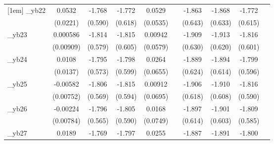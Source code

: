 \begin{table}[htbp]
\begin{tabular}{l*{9}{c}}
[1em]
\_yb22       &      0.0532\sym{**} &      -1.768\sym{***}&      -1.772\sym{***}&      0.0529         &                     &      -1.863\sym{***}&      -1.868\sym{***}&      -1.772\sym{***}&                     \\
            &    (0.0221)         &     (0.590)         &     (0.618)         &    (0.0535)         &                     &     (0.643)         &     (0.633)         &     (0.615)         &                     \\
[1em]
\_yb23       &    0.000586         &      -1.814\sym{***}&      -1.815\sym{***}&     0.00942         &                     &      -1.909\sym{***}&      -1.913\sym{***}&      -1.816\sym{***}&                     \\
            &   (0.00909)         &     (0.579)         &     (0.605)         &    (0.0579)         &                     &     (0.630)         &     (0.620)         &     (0.601)         &                     \\
[1em]
\_yb24       &      0.0108         &      -1.795\sym{***}&      -1.798\sym{***}&      0.0264         &                     &      -1.889\sym{***}&      -1.894\sym{***}&      -1.799\sym{***}&                     \\
            &    (0.0137)         &     (0.573)         &     (0.599)         &    (0.0655)         &                     &     (0.624)         &     (0.614)         &     (0.596)         &                     \\
[1em]
\_yb25       &    -0.00582         &      -1.806\sym{***}&      -1.815\sym{***}&     0.00912         &                     &      -1.906\sym{***}&      -1.910\sym{***}&      -1.816\sym{***}&                     \\
            &   (0.00752)         &     (0.569)         &     (0.594)         &    (0.0695)         &                     &     (0.618)         &     (0.608)         &     (0.590)         &                     \\
[1em]
\_yb26       &    -0.00224         &      -1.796\sym{***}&      -1.805\sym{***}&      0.0168         &                     &      -1.897\sym{***}&      -1.901\sym{***}&      -1.809\sym{***}&                     \\
            &   (0.00784)         &     (0.565)         &     (0.590)         &    (0.0749)         &                     &     (0.614)         &     (0.603)         &     (0.585)         &                     \\
[1em]
\_yb27       &      0.0189         &      -1.769\sym{***}&      -1.797\sym{***}&      0.0255         &                     &      -1.887\sym{***}&      -1.891\sym{***}&      -1.800\sym{***}&                     \\

\end{tabular}
\end{table}
